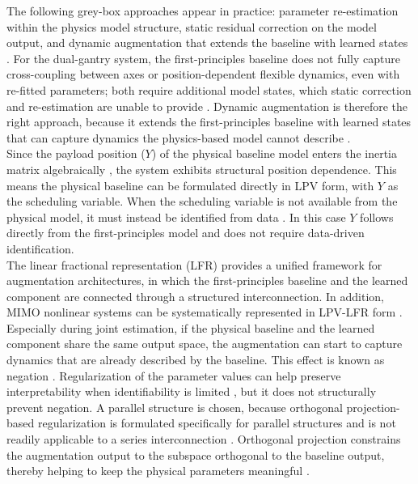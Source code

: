 The following grey-box approaches appear in practice: parameter re-estimation within the physics model structure, static residual correction on the model output, and dynamic augmentation that extends the baseline with learned states \cite{willard2020integrating, noel2018greybox}.
For the dual-gantry system, the first-principles baseline does not fully capture cross-coupling between axes or position-dependent flexible dynamics, even with re-fitted parameters; both require additional model states, which static correction and re-estimation are unable to provide \cite{hoekstra2026lfr}.
Dynamic augmentation is therefore the right approach, because it extends the first-principles baseline with learned states that can capture dynamics the physics-based model cannot describe \cite{hoekstra2026lfr}.
\\
Since the payload position ($Y$) of the physical baseline model enters the inertia matrix algebraically \cite{garcia2013model}, the system exhibits structural position dependence. This means the physical baseline can be formulated directly in LPV form, with $Y$ as the scheduling variable. When the scheduling variable is not available from the physical model, it must instead be identified from data \cite{verhoek2022deeplpv}. In this case $Y$ follows directly from the first-principles model and does not require data-driven identification.
\\
The linear fractional representation (LFR) \cite{hoekstra2026lfr} provides a unified framework for augmentation architectures, in which the first-principles baseline and the learned component are connected through a structured interconnection. In addition, MIMO nonlinear systems can be systematically represented in LPV-LFR form \cite{schoukenstoth2018mimo}. 
Especially during joint estimation, if the physical baseline and the learned component share the same output space, the augmentation can start to capture dynamics that are already described by the baseline. This effect is known as negation \cite{kon2022physics, gyorok2025l4dc, kessels2025ai}. Regularization of the parameter values can help preserve interpretability when identifiability is limited \cite{hotvedt2021identifiability}, but it does not structurally prevent negation. A parallel structure is chosen, because orthogonal projection-based regularization is formulated specifically for parallel structures and is not readily applicable to a series interconnection \cite{gyorok2025l4dc}. Orthogonal projection constrains the augmentation output to the subspace orthogonal to the baseline output, thereby helping to keep the physical parameters meaningful \cite{kon2022physics, gyorok2025l4dc}.
